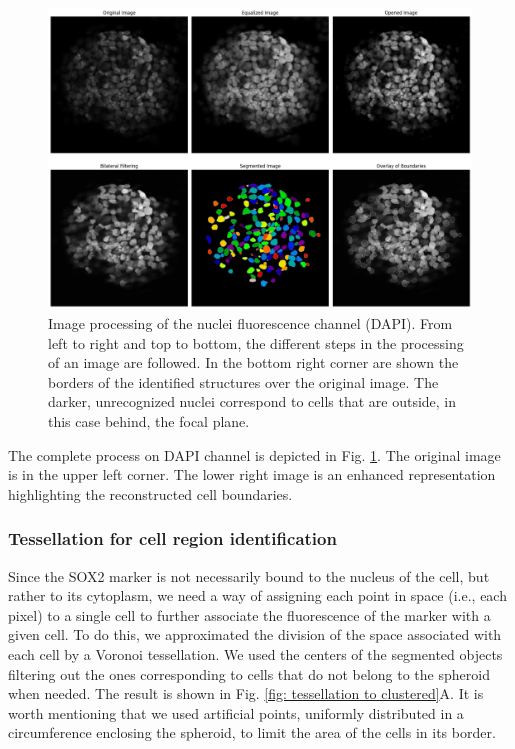 \documentclass[fleqn,10pt]{wlscirep}
\begin{document}
\begin{figure}[p]
    \centering
    \includegraphics[width=\textwidth]{images/sph1_slice3/nuclei_processing_horizontal.png}
    \caption{Image processing of the nuclei fluorescence channel (DAPI). From left to right and top to bottom, the different steps in the processing of an image are followed. In the bottom right corner are shown the borders of the identified structures over the original image. The darker, unrecognized nuclei correspond to cells that are outside, in this case behind, the focal plane.}
    \label{fig: nuclei processing}
\end{figure}

The complete process on DAPI channel is depicted in Fig. \ref{fig: nuclei processing}. The original image is in the upper left corner. The lower right image is an enhanced representation highlighting the reconstructed cell boundaries.  


\subsubsection*{Tessellation for cell region identification}
Since the SOX2 marker is not necessarily bound to the nucleus of the cell, but rather to its cytoplasm, we need a way of assigning each point in space (i.e., each pixel) to a single cell to further associate the fluorescence of the marker with a given cell. To do this, we approximated the division of the space associated with each cell by a Voronoi tessellation. We used the centers of the segmented objects filtering out the ones corresponding to cells that do not belong to the spheroid when needed. The result is shown in Fig. \ref{fig: tessellation to clustered}A. It is worth mentioning that we used artificial points, uniformly distributed in a circumference enclosing the spheroid, to limit the area of the cells in its border.
\end{document}
